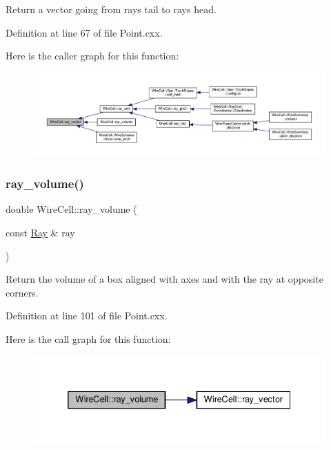 Return a vector going from ray\textquotesingle{}s tail to ray\textquotesingle{}s head. 

Definition at line 67 of file Point.\+cxx.

Here is the caller graph for this function\+:
\nopagebreak
\begin{figure}[H]
\begin{center}
\leavevmode
\includegraphics[width=350pt]{namespace_wire_cell_a3e825e090f86eed7647960e8e611a144_icgraph}
\end{center}
\end{figure}
\mbox{\label{namespace_wire_cell_a3f18b39220ac4ada841bc6cbf10751bf}} 
\subsubsection{\texorpdfstring{ray\+\_\+volume()}{ray\_volume()}}
{\footnotesize\ttfamily double Wire\+Cell\+::ray\+\_\+volume (\begin{DoxyParamCaption}\item[{const \hyperlink{namespace_wire_cell_a3ab20d9b438feb7eb1ffaab9ba98af0c}{Ray} \&}]{ray }\end{DoxyParamCaption})}

Return the volume of a box aligned with axes and with the ray at opposite corners. 

Definition at line 101 of file Point.\+cxx.

Here is the call graph for this function\+:
\nopagebreak
\begin{figure}[H]
\begin{center}
\leavevmode
\includegraphics[width=332pt]{namespace_wire_cell_a3f18b39220ac4ada841bc6cbf10751bf_cgraph}
\end{center}
\end{figure}
\mbox{\label{namespace_wire_cell_a1f69a2598e2cdb413ffac1157b50670a}} 
